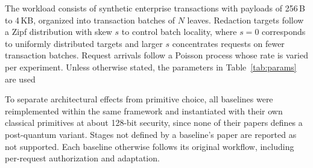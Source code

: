     The workload consists of synthetic enterprise transactions with payloads
    of 256\,B to 4\,KB, organized into transaction batches of $N$ leaves.
    Redaction targets follow a Zipf distribution with skew $s$ to control
    batch locality, where $s=0$ corresponds to uniformly distributed targets
    and larger $s$ concentrates requests on fewer transaction batches.
    Request arrivals follow a Poisson process whose rate is varied per
    experiment.
    Unless otherwise stated, the parameters in Table~\ref{tab:params} are
    used

    To separate architectural effects from primitive choice, all baselines were reimplemented within the same framework and
    instantiated with their own classical primitives at about 128-bit
    security, since none of their papers defines a post-quantum variant.
    Stages not
    defined by a baseline's paper are reported as not supported. Each baseline otherwise follows its original
    workflow, including per-request authorization and adaptation.

